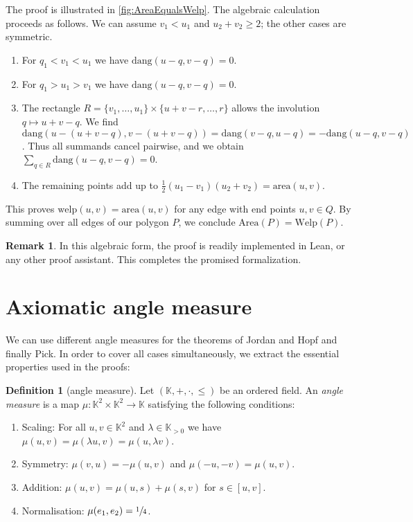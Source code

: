 \documentclass[a4paper]{amsart}
\numberwithin{equation}{section}
\theoremstyle{plain}
\theoremstyle{definition}
\newtheorem{definition}[theorem]{Definition}
\newtheorem{remark}[theorem]{Remark}
\newcommand{\K}{\mathbb{K}}
\newcommand{\area}{\mathrm{area}}
\newcommand{\Area}{\mathrm{Area}}
\newcommand{\dang}{\mathrm{dang}}
\newcommand{\welp}{\mathrm{welp}}
\newcommand{\Welp}{\mathrm{Welp}}
\begin{document}

The proof is illustrated in \autoref{fig:AreaEqualsWelp}.
The algebraic calculation proceeds as follows.
We can assume $v_1 < u_1$ and $u_2 + v_2 \ge 2$;
the other cases are symmetric.
\begin{enumerate}
\item
  For $q_1 < v_1 < u_1$ we have $\dang(u-q,v-q) = 0$.
\item
  For $q_1 > u_1 > v_1$ we have $\dang(u-q,v-q) = 0$.
\item
  The rectangle $R = \{v_1,\ldots,u_1\} \times \{u+v-r,\ldots,r\}$
  allows the involution $q \mapsto u+v-q$.
  We find $\dang(u-(u+v-q), v-(u+v-q)) = \dang(v-q,u-q) = -\dang(u-q,v-q)$.
  Thus all summands cancel pairwise,
  and we obtain $\sum_{q \in R} \dang(u-q,v-q) = 0$.
\item
  The remaining points add up to $\frac{1}{2} (u_1-v_1) (u_2+v_2) = \area(u,v)$.
\end{enumerate}

This proves $\welp(u,v) = \area(u,v)$
for any edge with end points $u,v \in Q$.
By summing over all edges of our polygon $P$,
we conclude $\Area(P) = \Welp(P)$.


\begin{remark}
  In this algebraic form, the proof is readily implemented in Lean,
  or any other proof assistant.  This completes the promised formalization.
\end{remark}


\appendix


\section{Axiomatic angle measure}

We can use different angle measures for the theorems of
Jordan and Hopf and finally Pick.
In order to cover all cases simultaneously, 
we extract the essential properties used in the proofs:

\begin{definition}[angle measure\label{def:AngleMeasure}]
  Let $(\K,+,\cdot,\le)$ be an ordered field.
  An \emph{angle measure} is a map $\mu \colon \K^2 \times \K^2 \to \K$
  satisfying the following conditions:
  \begin{enumerate}
  \item
    Scaling: For all $u,v \in \K^2$ and $\lambda \in \K_{>0}$
    we have $\mu(u,v) = \mu(\lambda u, v) = \mu(u, \lambda v)$.
  \item
    Symmetry: $\mu(v,u) = -\mu(u,v)$ and $\mu(-u,-v) = \mu(u,v)$.
  \item
    Addition: $\mu(u,v) = \mu(u,s) + \mu(s,v)$ for $s \in [u,v]$.
  \item
    Normalisation: $\mu(e_1,e_2) = \sfrac{1}{4}$.
  \end{enumerate}
\end{definition}
\end{document}
